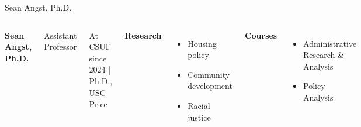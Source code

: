 \documentclass[10pt]{beamer}
\newlength{\imageheight}
\begin{document}
\begin{frame}{Sean Angst, Ph.D.}
\begin{columns}[T,onlytextwidth]
    \raggedright
    {\large\bfseries Sean Angst, Ph.D.}\par
    {Assistant Professor}\par
    {\footnotesize At CSUF since 2024 \quad | \quad Ph.D., USC Price}\par\vspace{0.4em}

    \textbf{Research}
    \begin{itemize}
      \item Housing policy
      \item Community development
      \item Racial justice
    \end{itemize}

    \textbf{Courses}
    \begin{itemize}
      \item Administrative Research \& Analysis
      \item Policy Analysis
    \end{itemize}

    \vspace*{0.25cm}
    \includegraphics[height=\imageheight]{images/angst.jpg}
\end{columns}
\end{frame}
\end{document}
